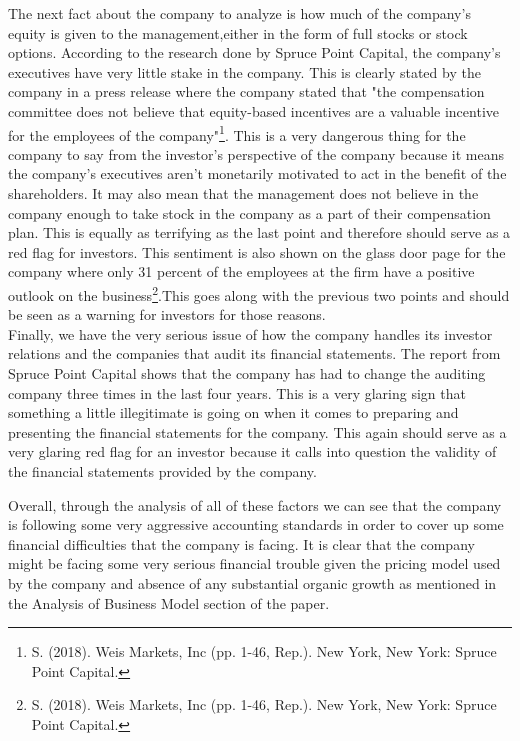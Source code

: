 \documentclass[12pt]{article}
\begin{document}
\begin{doublespacing}
The next fact about the company to analyze is how much of the company's equity is given to the management,either in the form of full stocks or stock options. According to the research done by Spruce Point Capital, the company's executives have very little stake in the company. This is clearly stated by the company in a press release where the company stated that "the compensation committee does not believe that equity-based incentives are a valuable incentive for the employees of the company"\footnote{S. (2018). Weis Markets, Inc (pp. 1-46, Rep.). New York, New York: Spruce Point Capital.}. This is a very dangerous thing for the company to say from the investor's perspective of the company because it means the company's executives aren't monetarily motivated to act in the benefit of the shareholders. It may also mean that the management does not believe in the company enough to take stock in the company as a part of their compensation plan. This is equally as terrifying as the last point and therefore should serve as a red flag for investors. This sentiment is also shown on the glass door page for the company where only 31 percent of the employees at the firm have a positive outlook on the business\footnote{S. (2018). Weis Markets, Inc (pp. 1-46, Rep.). New York, New York: Spruce Point Capital.}.This goes along with the previous two points and should be seen as a warning for investors for those reasons.
\\
Finally, we have the very serious issue of how the company handles its investor relations and the companies that audit its financial statements. The report from Spruce Point Capital shows that the company has had to change the auditing company three times in the last four years. This is a very glaring sign that something a little illegitimate is going on when it comes to preparing and presenting the financial statements for the company. This again should serve as a very glaring red flag for an investor because it calls into question the validity of the financial statements provided by the company. 

Overall, through the analysis of all of these factors we can see that the company is following some very aggressive accounting standards in order to cover up some financial difficulties that the company is facing. It is clear that the company might be facing some very serious financial trouble given the pricing model used by the company and absence of any substantial organic growth as mentioned in the Analysis of Business Model section of the paper.
\\


\end{doublespacing}
\end{document}
